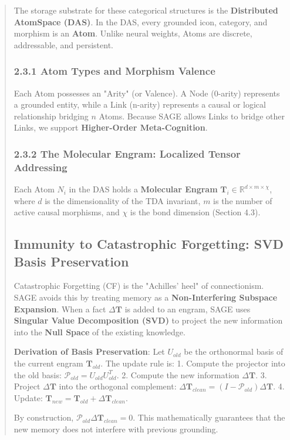 \documentclass[10pt,twocolumn,letterpaper]{article}
\begin{document}
\begin{abstract}
The storage substrate for these categorical structures is the \textbf{Distributed AtomSpace (DAS)}. In the DAS, every grounded icon, category, and morphism is an \textbf{Atom}. Unlike neural weights, Atoms are discrete, addressable, and persistent.

\subsubsection{2.3.1 Atom Types and Morphism Valence}
Each Atom possesses an "Arity" (or Valence). A Node (0-arity) represents a grounded entity, while a Link (n-arity) represents a causal or logical relationship bridging $n$ Atoms. Because SAGE allows Links to bridge other Links, we support \textbf{Higher-Order Meta-Cognition}.

\subsubsection{2.3.2 The Molecular Engram: Localized Tensor Addressing}
Each Atom $N_i$ in the DAS holds a \textbf{Molecular Engram} $\mathbf{T}_i \in \mathbb{R}^{d \times m \times \chi}$, where $d$ is the dimensionality of the TDA invariant, $m$ is the number of active causal morphisms, and $\chi$ is the bond dimension (Section 4.3).

\subsection{Immunity to Catastrophic Forgetting: SVD Basis Preservation}

Catastrophic Forgetting (CF) is the "Achilles' heel" of connectionism. SAGE avoids this by treating memory as a \textbf{Non-Interfering Subspace Expansion}. When a fact $\Delta \mathbf{T}$ is added to an engram, SAGE uses \textbf{Singular Value Decomposition (SVD)} to project the new information into the \textbf{Null Space} of the existing knowledge.

\textbf{Derivation of Basis Preservation}:
Let $U_{old}$ be the orthonormal basis of the current engram $\mathbf{T}_{old}$. The update rule is:
1.  Compute the projector into the old basis: $\mathcal{P}_{old} = U_{old}U_{old}^T$.
2.  Compute the new information $\Delta \mathbf{T}$.
3.  Project $\Delta \mathbf{T}$ into the orthogonal complement: $\Delta \mathbf{T}_{clean} = (I - \mathcal{P}_{old}) \Delta \mathbf{T}$.
4.  Update: $\mathbf{T}_{new} = \mathbf{T}_{old} + \Delta \mathbf{T}_{clean}$.

By construction, $\mathcal{P}_{old} \Delta \mathbf{T}_{clean} = 0$. This mathematically guarantees that the new memory does not interfere with previous grounding.



\end{abstract}
\end{document}
